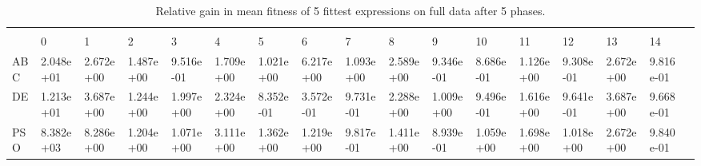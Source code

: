 \begin{landscape}
\begin{table}[]
\centering
\caption{Relative gain in mean fitness of 5 fittest expressions on full data after 5 phases.}
\label{table:5phasemeanfull}
\begin{adjustbox}{width=1.7\textwidth}
\begin{tabular}{lllllllllllllllll}
    &           &           &           &           &           &           &           &           &           &           &           &           &           &           &           &  \\
    & 0         & 1         & 2         & 3         & 4         & 5         & 6         & 7         & 8         & 9         & 10        & 11        & 12        & 13        & 14        &  \\
ABC                 & 2.048e+01 & 2.672e+00 & 1.487e+00 & 9.516e-01 & 1.709e+00 & 1.021e+00 & 6.217e+00 & 1.093e+00 & 2.589e+00 & 9.346e-01 & 8.686e-01 & 1.126e+00 & 9.308e-01 & 2.672e+00 & 9.816e-01 &  \\
DE                  & 1.213e+01 & 3.687e+00 & 1.244e+00 & 1.997e+00 & 2.324e+00 & 8.352e-01 & 3.572e-01 & 9.731e-01 & 2.288e+00 & 1.009e+00 & 9.496e-01 & 1.616e+00 & 9.641e-01 & 3.687e+00 & 9.668e-01 &  \\
PSO                 & 8.382e+03 & 8.286e+00 & 1.204e+00 & 1.071e+00 & 3.111e+00 & 1.362e+00 & 1.219e+00 & 9.817e-01 & 1.411e+00 & 8.939e-01 & 1.059e+00 & 1.698e+00 & 1.018e+00 & 2.672e+00 & 9.840e-01 & 

\end{tabular}
\end{adjustbox}
\end{table}
\end{landscape}

